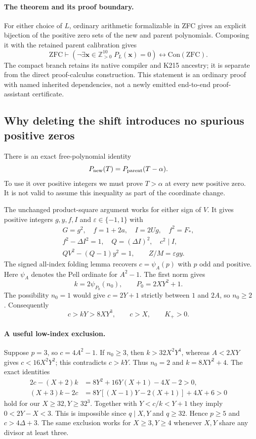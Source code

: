 \paragraph{The theorem and its proof boundary.}
For either choice of $L$, ordinary arithmetic formalizable in ZFC gives
an explicit bijection of the positive zero sets of the new and parent
polynomials. Composing it with the retained parent calibration gives
\[
 \mathrm{ZFC}\vdash
 \left(\neg\exists\mathbf x\in\mathbb Z_{>0}^{10}\;
 P_L(\mathbf x)=0\right)
 \longleftrightarrow\mathrm{Con}(\mathrm{ZFC}).
\]
The compact branch retains its native compiler and K215 ancestry; it is
separate from the direct proof-calculus construction. This statement is an
ordinary proof with named inherited dependencies, not a newly emitted
end-to-end proof-assistant certificate.

\subsection{Why deleting the shift introduces no spurious positive zeros}

There is an exact free-polynomial identity
\[
 P_{\rm new}(T)=P_{\rm parent}(T-\alpha).
\]
To use it over positive integers we must prove $T>\alpha$ at every new
positive zero. It is not valid to assume this inequality as part of the
coordinate change.

The unchanged product-square argument works for either sign of $V$. It
gives positive integers $g,y,f,I$ and $\varepsilon\in\{-1,1\}$ with
\begin{gather*}
 G=g^2,\quad f=1+2a,\quad I=2Ug,\quad f^2=F_*,\\
 f^2-\Delta I^2=1,\quad Q=(\Delta I)^2,\quad c^2\mid I,\\
 QV^2-(Q-1)y^2=1,\qquad Z/M=\varepsilon gy.
\end{gather*}
The signed all-index folding lemma recovers $c=\psi_A(p)$ with $p$ odd
and positive. Here $\psi_A$ denotes the Pell ordinate for $A^2-1$.
The first norm gives
\[
 k=2\psi_{P_0}(n_0),\qquad P_0=2XY^2+1.
\]
The possibility $n_0=1$ would give $c=2Y+1$ strictly between $1$ and
$2A$, so $n_0\ge2$. Consequently
\[
 c>kY>8XY^3,\qquad c>X,\qquad K_+>0.
\]

\paragraph{A useful low-index exclusion.}
Suppose $p=3$, so $c=4A^2-1$. If $n_0\ge3$, then
$k>32X^2Y^4$, whereas $A<2XY$ gives $c<16X^2Y^2$; this contradicts
$c>kY$. Thus $n_0=2$ and $k=8XY^2+4$. The exact identities
\begin{align*}
 2c-(X+2)k&=8Y^2+16Y(X+1)-4X-2>0,\\
 (X+3)k-2c&=8Y[(X-1)Y-2(X+1)]+4X+6>0
\end{align*}
hold for our $X\ge32,Y\ge32^3$. Together with $Y<c/k<Y+1$ they imply
$0<2Y-X<3$. This is impossible since $q\mid X,Y$ and $q\ge32$.
Hence $p\ge5$ and $c>4\Delta+3$. The same exclusion works for
$X\ge3,Y\ge4$ whenever $X,Y$ share any divisor at least three.

